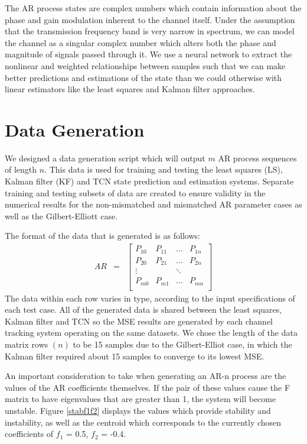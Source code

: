 \documentclass[twocolumn,letterpaper]{IEEEAerospaceCLS}  %
\begin{document}
The AR process states are complex numbers which contain information about the phase and gain modulation inherent to the channel itself. Under the assumption that the transmission frequency band is very narrow in spectrum, we can model the channel as a singular complex number which alters both the phase and magnitude of signals passed through it. We use a neural network to extract the nonlinear and weighted relationships between samples such that we can make better predictions and estimations of the state than we could otherwise with linear estimators like the least squares and Kalman filter approaches. 


\section{Data Generation}

\label{sec:dgen}

We designed a data generation script which will output $m$ AR process sequences of length $n$. This data is used for training and testing the least squares (LS), Kalman filter (KF) and TCN state prediction and estimation systems. Separate training and testing subsets of data are created to ensure validity in the numerical results for the non-mismatched and mismatched AR parameter cases as well as the Gilbert-Elliott case.

The format of the data that is generated is as follows: 
\begin{eqnarray*}
AR&=&\begin{bmatrix} 
P_{10} & P_{11} & ... & P_{1n} \\
P_{20} & P_{21} & ... & P_{2n} \\
\vdots &  & \ddots &  \\
P_{m0} & P_{m1} & ... & P_{mn} \\
\end{bmatrix}
\end{eqnarray*}
The data within each row varies in type, according to the input specifications of each test case. All of the generated data is shared between the least squares, Kalman filter and TCN so the MSE results are generated by each channel tracking system operating on the same datasets. We chose the length of the data matrix rows $(n)$ to be 15 samples due to the Gilbert-Elliot case, in which the Kalman filter required about 15 samples to converge to its lowest MSE.

An important consideration to take when generating an AR-n process are the values of the AR coefficients themselves. If the pair of these values cause the F matrix to have eigenvalues that are greater than 1, the system will become unstable. Figure \ref{stabf1f2} displays the values which provide stability and instability, as well as the centroid which corresponds to the currently chosen coefficients of $f_1$ = 0.5, $f_2$ = -0.4.
\end{document}
